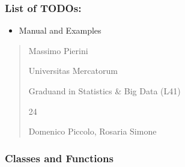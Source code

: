 \documentclass[letterpaper,10pt,english]{sphinxmanual}
\begin{document}
\subsubsection{List of TODOs:}
\label{\detokenize{cubmods:id103}}\begin{itemize}
\item {} 
\sphinxAtStartPar
Manual and Examples

\end{itemize}
\begin{quote}\begin{description}
\sphinxAtStartPar
Massimo Pierini

\sphinxAtStartPar
Universitas Mercatorum

\sphinxAtStartPar
Graduand in Statistics \& Big Data (L41)

\sphinxhyphen{}24

\sphinxAtStartPar
Domenico Piccolo, Rosaria Simone

\sphinxAtStartPar
{}

\end{description}\end{quote}


\subsubsection{Classes and Functions}
\label{\detokenize{cubmods:id104}}
\end{document}
